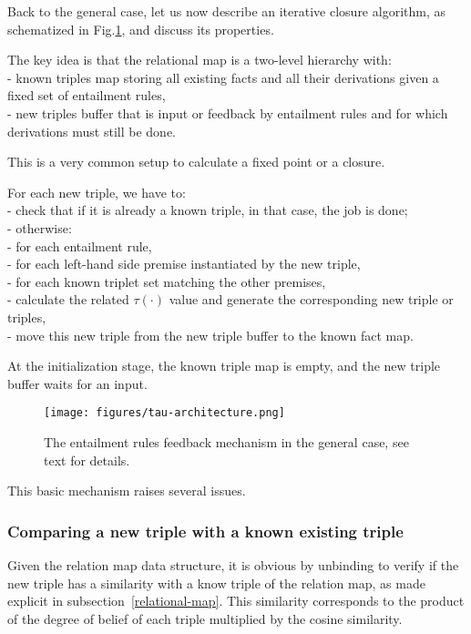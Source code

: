 \documentclass[sn-mathphys]{sn-jnl}
\newcommand{\tab}{\hphantom{~}}
\begin{document}
Back to the general case, let us now describe an iterative closure algorithm, as schematized in Fig.\ref{tau-architecture}, and discuss its properties.

The key idea is that the relational map is a two-level hierarchy with:
\\- known triples map storing all existing facts and all their derivations given a fixed set of entailment rules,
\\- new triples buffer that is input or feedback by entailment rules and for which derivations must still be done.

This is a very common setup to calculate a fixed point or a closure.

For each new triple, we have to:
\\ - check that if it is already a known triple, in that case, the job is done;
\\ - otherwise:
\\ \tab - for each entailment rule,
\\ \tab \tab - for each left-hand side premise instantiated by the new triple,
\\ \tab \tab \tab - for each known triplet set matching the other premises,
\\ \tab \tab \tab \tab - calculate the related $\tau(\cdot)$ value and generate the corresponding new triple or triples,
\\ - move this new triple from the new triple buffer to the known fact map.

At the initialization stage, the known triple map is empty, and the new triple buffer waits for an input.

\begin{figure}[htbp]
\centerline{\texttt{[image: figures/tau-architecture.png]}}
\caption{The entailment rules feedback mechanism in the general case, see text for details.}
\label{tau-architecture}
\end{figure}

This basic mechanism raises several issues.

\subsubsection{Comparing a new triple with a known existing triple}

Given the relation map data structure, it is obvious by unbinding to verify if the new triple has a similarity with a know triple of the relation map, as made explicit in subsection~\ref{relational-map}. This similarity corresponds to the product of the degree of belief of each triple multiplied by the cosine similarity.
\end{document}
